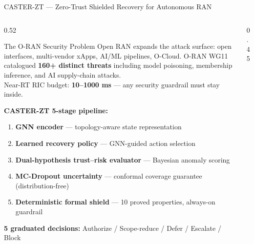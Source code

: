 \documentclass[aspectratio=169, 11pt]{beamer}
\begin{document}
\begin{frame}{CASTER-ZT — Zero-Trust Shielded Recovery for Autonomous RAN}

\begin{columns}[T]
\begin{column}{0.52\textwidth}

  \begin{block}{The O-RAN Security Problem}
    \vspace{2pt}
    Open RAN expands the attack surface: open interfaces, multi-vendor xApps,
    AI/ML pipelines, O-Cloud. O-RAN WG11 catalogued
    \textbf{160+ distinct threats} including model poisoning,
    membership inference, and AI supply-chain attacks.\\[4pt]
    Near-RT RIC budget: \textbf{10–1000 ms} — any security guardrail must stay inside.
    \vspace{2pt}
  \end{block}

  \vspace{4pt}
  \textbf{CASTER-ZT 5-stage pipeline:}
  \begin{enumerate}\setlength{\itemsep}{1pt}
    \item \textbf{GNN encoder} — topology-aware state representation
    \item \textbf{Learned recovery policy} — GNN-guided action selection
    \item \textbf{Dual-hypothesis trust–risk evaluator} — Bayesian anomaly scoring
    \item \textbf{MC-Dropout uncertainty} — conformal coverage guarantee (distribution-free)
    \item \textbf{Deterministic formal shield} — 10 proved properties, always-on guardrail
  \end{enumerate}

  \vspace{4pt}
  \textbf{5 graduated decisions:}
  {\small Authorize / Scope-reduce / Defer / Escalate / Block}

\end{column}
\begin{column}{0.45\textwidth}


\end{column}
\end{columns}
\end{frame}
\end{document}
